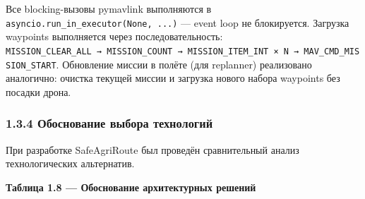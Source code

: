 Все blocking-вызовы pymavlink выполняются в \texttt{asyncio.run\_in\_executor(None,\ ...)} --- event loop не блокируется. Загрузка waypoints выполняется через последовательность: \texttt{MISSION\_CLEAR\_ALL\ →\ MISSION\_COUNT\ →\ MISSION\_ITEM\_INT\ ×\ N\ →\ MAV\_CMD\_MISSION\_START}. Обновление миссии в полёте (для replanner) реализовано аналогично: очистка текущей миссии и загрузка нового набора waypoints без посадки дрона.

\hypertarget{ux43eux431ux43eux441ux43dux43eux432ux430ux43dux438ux435-ux432ux44bux431ux43eux440ux430-ux442ux435ux445ux43dux43eux43bux43eux433ux438ux439}{%
\subsubsection{1.3.4 Обоснование выбора технологий}\label{ux43eux431ux43eux441ux43dux43eux432ux430ux43dux438ux435-ux432ux44bux431ux43eux440ux430-ux442ux435ux445ux43dux43eux43bux43eux433ux438ux439}}

При разработке SafeAgriRoute был проведён сравнительный анализ технологических альтернатив.

\textbf{Таблица 1.8 --- Обоснование архитектурных решений}

